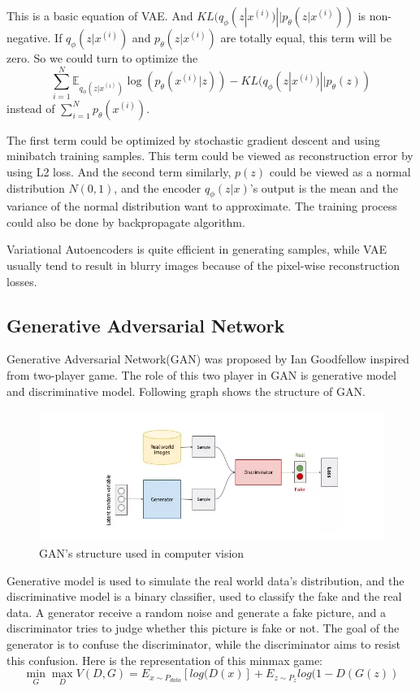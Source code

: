 \documentclass{kththesis}
\begin{document}
This is a basic equation of VAE. And $KL(q_{\phi}(z|x^{(i)})||p_{\theta}(z|x^{(i)}))$ is non-negative. If $q_{\phi}(z|x^{(i)})$ and $p_{\theta}(z|x^{(i)})$ are totally equal, this term will be zero. So we could turn to optimize the
\begin{equation}
     \sum_{i=1}^N\mathbb{E}_{q_{\phi}(z|x^{(i)})} \log(p_{\theta}(x^{(i)}|z)) - KL(q_{\phi}(z|x^{(i)})||p_{\theta}(z))
\end{equation}
instead of $\sum_{i=1}^N p_\theta(x^{(i)})$.

The first term could be optimized by stochastic gradient descent and using minibatch training samples. This term could be viewed as reconstruction error by using L2 loss. And the second term similarly, $p(z)$ could be viewed as a normal distribution $N(0,1)$, and the encoder $q_{\phi}(z|x)$'s output is the mean and the variance of the normal distribution want to approximate. The training process could also be done by backpropagate algorithm. 

Variational Autoencoders is quite efficient in generating samples, while VAE usually tend to result in blurry images\cite{doersch2016tutorial} because of the pixel-wise reconstruction losses.
\subsection{Generative Adversarial Network}
Generative Adversarial Network(GAN) was proposed by Ian Goodfellow\cite{goodfellow2014generative} inspired from two-player game. The role of this two player in GAN is generative model and discriminative model. Following graph shows the structure of GAN.

\begin{figure}[H]
    \centering
    \includegraphics[scale = 0.6]{GAN.png}
    \caption{GAN's structure used in computer vision}
\end{figure}

\noindent Generative model is used to simulate the real world data's distribution, and the discriminative model is a binary classifier, used to classify the fake and the real data. A generator receive a random noise and generate a fake picture, and a discriminator tries to judge whether this picture is fake or not. The goal of the generator is to confuse the discriminator, while the discriminator aims to resist this confusion. Here is the representation of this minmax game:
\begin{equation}
    \min \limits_G \max \limits_D V(D,G) = E_{x\sim P_{data}}[log(D(x)] +  E_{z\sim P_{z}}log(1-D(G(z)) 
\end{equation}
\end{document}
